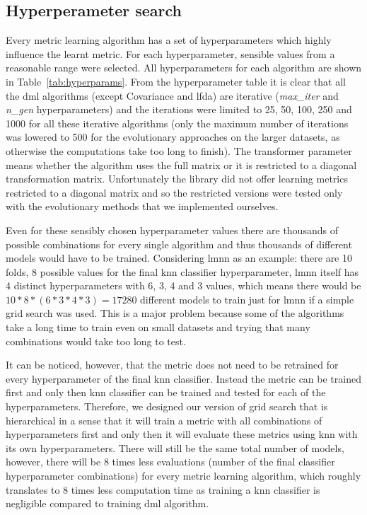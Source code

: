 \subsection{Hyperperameter search} \label{chap:exp:hypsearch}

Every metric learning algorithm has a set of hyperparameters which highly influence the learnt metric. For each hyperparameter, sensible values from a reasonable range were selected. All hyperparameters for each algorithm are shown in Table~\ref{tab:hyperparams}. From the hyperparameter table it is clear that all the \ac{dml} algorithms (except Covariance and \ac{lfda}) are iterative (\textit{max\_iter} and \textit{n\_gen} hyperparameters) and the iterations were limited to 25, 50, 100, 250 and 1000 for all these iterative algorithms (only the maximum number of iterations was lowered to 500 for the evolutionary approaches on the larger datasets, as otherwise the computations take too long to finish). The transformer parameter means whether the algorithm uses the full matrix or it is restricted to a diagonal transformation matrix. Unfortunately the library did not offer learning metrics restricted to a diagonal matrix and so the restricted versions were tested only with the evolutionary methods that we implemented ourselves.



Even for these sensibly chosen hyperparameter values there are thousands of possible combinations for every single algorithm and thus thousands of different models would have to be trained. Considering \ac{lmnn} as an example: there are 10 folds, 8 possible values for the final \ac{knn} classifier hyperparameter, \ac{lmnn} itself has 4 distinct hyperparameters with 6, 3, 4 and 3 values, which means there would be $10*8*(6*3*4*3)=17280$ different models to train just for \ac{lmnn} if a simple grid search was used. This is a major problem because some of the algorithms take a long time to train even on small datasets and trying that many combinations would take too long to test.

It can be noticed, however, that the metric does not need to be retrained for every hyperparameter of the final \ac{knn} classifier. Instead the metric can be trained first and only then \ac{knn} classifier can be trained and tested for each of the hyperparameters. Therefore, we designed our version of grid search that is hierarchical in a sense that it will train a metric with all combinations of hyperparameters first and only then it will evaluate these metrics using \ac{knn} with its own hyperparameters. There will still be the same total number of models, however, there will be 8 times less evaluations (number of the final classifier hyperparameter combinations) for every metric learning algorithm, which roughly translates to 8 times less computation time as training a \ac{knn} classifier is negligible compared to training \ac{dml} algorithm.

